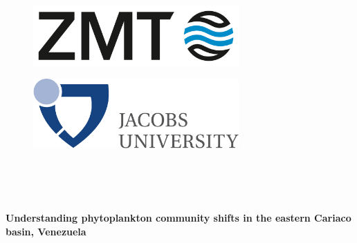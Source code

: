\begin{titlepage}
\begin{center}

\begin{figure}[ht]
\begin{minipage}[b]{0.5\linewidth}
\centering
\includegraphics[width=0.7\textwidth]{./0-titel/ZMT_Logo_BILDMARKE_rgb_ENG.png}\\ 
\end{minipage}
\hspace{0.5cm}
\begin{minipage}[b]{0.5\linewidth}
\centering
\includegraphics[width=0.7\textwidth]{./0-titel/jacobs_big.pdf}\\
\end{minipage}
\end{figure}

\vspace{1cm}

\\[1.cm]

\\[1.5cm]

\vspace{2cm}

\\[0.5 cm]


{ \Huge \bfseries Understanding phytoplankton community shifts in the eastern Cariaco basin, Venezuela}\\[0.4cm]


\end{center}
\end{titlepage}
